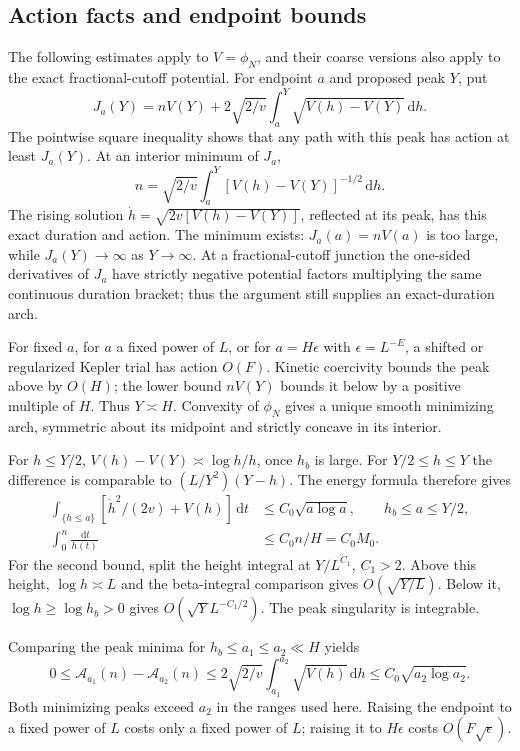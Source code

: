 \documentclass[11pt,letterpaper]{article}
\numberwithin{equation}{section}
\theoremstyle{remark}\newtheorem{remark}[theorem]{Remark}
\newcommand{\A}{\mathcal A}
\newcommand{\dd}{\,\mathrm d}
\begin{document}
\subsection{Action facts and endpoint bounds}
The following estimates apply to $V=\phi_N$, and their coarse versions
also apply to the exact fractional-cutoff potential. For endpoint
$a$ and proposed peak $Y$, put
\[
 J_a(Y)=nV(Y)+2\sqrt{2/v}\int_a^Y\sqrt{V(h)-V(Y)}\dd h.
\]
The pointwise square inequality shows that any path with this peak has
action at least $J_a(Y)$. At an interior minimum of $J_a$,
\begin{equation}\label{a61:ao:eq:durationgeneral}
 n=\sqrt{2/v}\int_a^Y[V(h)-V(Y)]^{-1/2}\dd h.
\end{equation}
The rising solution
$\dot h=\sqrt{2v[V(h)-V(Y)]}$, reflected at its peak, has this exact
duration and action. The minimum exists: $J_a(a)=nV(a)$ is too large,
while $J_a(Y)\to\infty$ as $Y\to\infty$. At a fractional-cutoff
junction the one-sided derivatives of $J_a$ have strictly negative
potential factors multiplying the same continuous duration bracket;
thus the argument still supplies an exact-duration arch.

For fixed $a$, for $a$ a fixed power of $L$, or for
$a=H\epsilon$ with $\epsilon=L^{-E}$, a shifted or regularized Kepler
trial has action $O(F)$. Kinetic coercivity bounds the peak above by
$O(H)$; the lower bound $nV(Y)$ bounds it below by a positive multiple
of $H$. Thus $Y\asymp H$. Convexity of $\phi_N$ gives a unique smooth
minimizing arch, symmetric about its midpoint and strictly concave in
its interior.

For $h\le Y/2$, $V(h)-V(Y)\asymp\log h/h$, once $h_b$ is large.
For $Y/2\le h\le Y$ the difference is comparable to
$(L/Y^2)(Y-h)$. The energy formula therefore gives
\begin{align}
 \int_{\{h\le a\}}[\dot h^2/(2v)+V(h)]\dd t
 &\le C_0\sqrt{a\log a},\qquad h_b\le a\le Y/2,
 \label{a61:ao:eq:endpointaction}\\
 \int_0^n\frac{\dd t}{h(t)}&\le C_0n/H=C_0M_0.
 \label{a61:ao:eq:reciprocal}
\end{align}
For the second bound, split the height integral at $Y/L^{C_1}$,
$C_1>2$. Above this height, $\log h\asymp L$ and the beta-integral
comparison gives $O(\sqrt{Y/L})$. Below it, $\log h\ge\log h_b>0$
gives $O(\sqrt Y L^{-C_1/2})$. The peak singularity is integrable.

Comparing the peak minima for $h_b\le a_1\le a_2\ll H$ yields
\begin{equation}\label{a61:ao:eq:endpointcomparison}
 0\le\A_{a_1}(n)-\A_{a_2}(n)
 \le2\sqrt{2/v}\int_{a_1}^{a_2}\sqrt{V(h)}\dd h
 \le C_0\sqrt{a_2\log a_2}.
\end{equation}
Both minimizing peaks exceed $a_2$ in the ranges used here.
Raising the endpoint to a fixed power of $L$ costs only a fixed power
of $L$; raising it to $H\epsilon$ costs $O(F\sqrt\epsilon)$.
\end{document}
